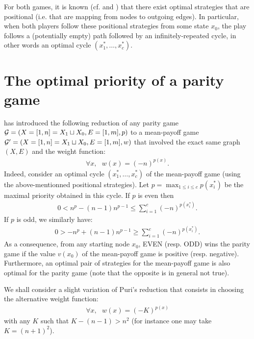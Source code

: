 \documentclass{article}
\def\G{{\cal G}}
\begin{document}
For both games, it is known (cf. \citet{zielonka98} and \citet{ehrenfeucht79}) that there exist optimal strategies that are positional (i.e. that are mapping from nodes to outgoing edges). In particular, when both players follow these positional strategies from some state $x_0$, the play follows a (potentially empty) path followed by an infinitely-repeated cycle, in other words an optimal cycle $(x^*_1,\dots,x^*_c)$.

\section{The optimal priority of a parity game}

\citet{puri96} has introduced the following reduction of any parity game $\G=(X=[1,n]=X_1 \sqcup X_0,E=[1,m],p)$ to a mean-payoff game $\G'=(X=[1,n]=X_1 \sqcup X_0,E=[1,m],w)$ that involved the exact same graph $(X,E)$ and the weight function:
\begin{align}
  \forall x,~~~ w(x) = (-n)^{p(x)}.
\end{align}
Indeed, consider an optimal cycle $(x^*_1,\dots,x^*_c)$ of the mean-payoff game (using the above-mentionned positional strategies). Let $p=\max_{1 \le i \le c} p(x^*_i)$ be the maximal priority obtained in this cycle. If $p$ is even then
\begin{align}
 0 <  n^{p} - (n-1) n^{p-1} \le  \sum_{i=1}^{c} (-n)^{p(x^*_i)}.
\end{align}
If $p$ is odd, we similarly have:
\begin{align}
0 > -n^{p} + (n-1) n^{p-1} \ge   \sum_{i=1}^{c} (-n)^{p(x^*_i)}.
\end{align}
As a consequence, from any starting node $x_0$, EVEN (resp. ODD) wins the parity game if the value $v(x_0)$ of the mean-payoff game  is positive (resp. negative). Furthermore, an optimal pair of strategies for the mean-payoff game is also optimal for the parity game (note that the opposite is in general not true).

We shall consider a slight variation of Puri's reduction that consists in choosing the alternative weight function:
\begin{align}
  \forall x,~~~ w(x) = (-K)^{p(x)}
\end{align}
with any $K$ such that $K-(n-1) > n^2$
(for instance one may take $K=(n+1)^2$).
\end{document}

